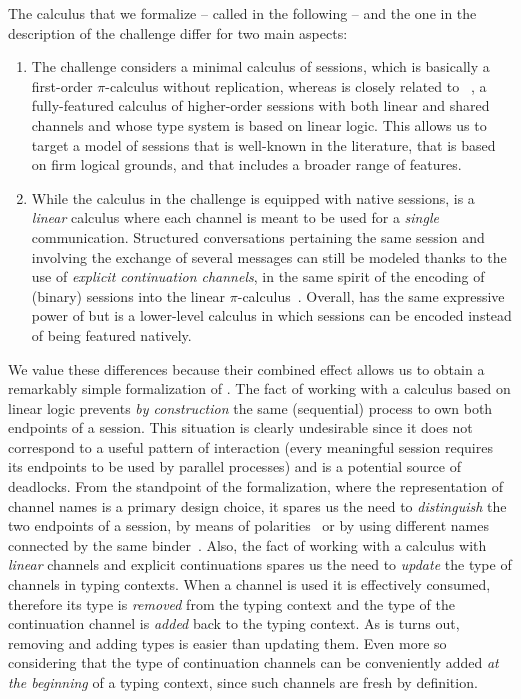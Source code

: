 The calculus that we formalize -- called \Calculus in the following -- and the
one in the description of the challenge differ for two main aspects:
\begin{enumerate}
\item The challenge considers a minimal calculus of sessions, which is basically
    a first-order $\pi$-calculus without replication, whereas \Calculus is
    closely related to
    \CP~\citep{CairesPfenning10,Wadler14,CairesPfenningToninho16}, a
    fully-featured calculus of higher-order sessions with both linear and shared
    channels and whose type system is based on linear logic.
    This allows us to target a model of sessions that is well-known in the
    literature, that is based on firm logical grounds, and that includes a
    broader range of features.
\item While the calculus in the challenge is equipped with native sessions,
    \Calculus is a \emph{linear} calculus where each channel is meant to be used
    for a \emph{single} communication. Structured conversations pertaining the
    same session and involving the exchange of several messages can still be
    modeled thanks to the use of \emph{explicit continuation channels}, in the
    same spirit of the encoding of (binary) sessions into the linear
    $\pi$-calculus~\citep{KobayashiPierceTurner99,Kobayashi02b,DardhaGiachinoSangiorgi17}.
    Overall, \Calculus has the same expressive power of \CP but is a lower-level
    calculus in which sessions can be encoded instead of being featured
    natively.
\end{enumerate}

We value these differences because their combined effect allows us to obtain a
remarkably simple formalization of \Calculus.
%
The fact of working with a calculus based on linear logic prevents \emph{by
construction} the same (sequential) process to own both endpoints of a session.
This situation is clearly undesirable since it does not correspond to a useful
pattern of interaction (every meaningful session requires its endpoints to be
used by parallel processes) and is a potential source of deadlocks.
%
From the standpoint of the formalization, where the representation of channel
names is a primary design choice, it spares us the need to \emph{distinguish}
the two endpoints of a session, \eg by means of polarities~\citep{GayHole05} or
by using different names connected by the same
binder~\citep{Vasconcelos12,GayVasconcelos25}.
%
Also, the fact of working with a calculus with \emph{linear} channels and
explicit continuations spares us the need to \emph{update} the type of channels
in typing contexts. When a channel is used it is effectively consumed, therefore
its type is \emph{removed} from the typing context and the type of the
continuation channel is \emph{added} back to the typing context. As is turns
out, removing and adding types is easier than updating them. Even more so
considering that the type of continuation channels can be conveniently added
\emph{at the beginning} of a typing context, since such channels are fresh by
definition.

